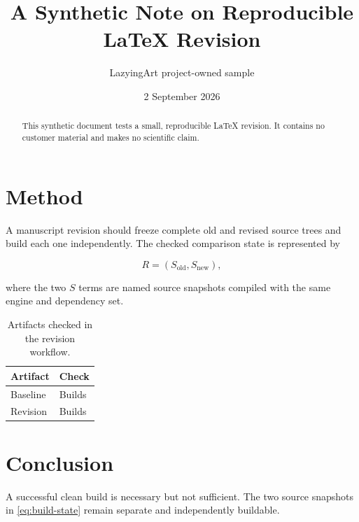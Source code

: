 \documentclass[11pt,a4paper]{article}
\title{A Synthetic Note on Reproducible LaTeX Revision}
\author{LazyingArt project-owned sample}
\date{2 September 2026}
\begin{document}
\maketitle

\begin{abstract}
This synthetic document tests a small, reproducible LaTeX revision. It contains no
customer material and makes no scientific claim.
\end{abstract}

\section{Method}

A manuscript revision should freeze complete old and revised source trees and
build each one independently. The checked comparison state is represented by

\begin{equation}
  R = (S_{\mathrm{old}}, S_{\mathrm{new}}),
  \label{eq:build-state}
\end{equation}

where the two $S$ terms are named source snapshots compiled with the same engine
and dependency set.

\begin{table}[ht]
  \centering
  \caption{Artifacts checked in the revision workflow.}
  \label{tab:artifacts}
  \begin{tabular}{ll}
    \toprule
    Artifact & Check \\
    \midrule
    Baseline & Builds \\
    Revision & Builds \\
    \bottomrule
  \end{tabular}
\end{table}

\section{Conclusion}

A successful clean build is necessary but not sufficient. The two source
snapshots in \eqref{eq:build-state} remain separate and independently buildable.
\end{document}
